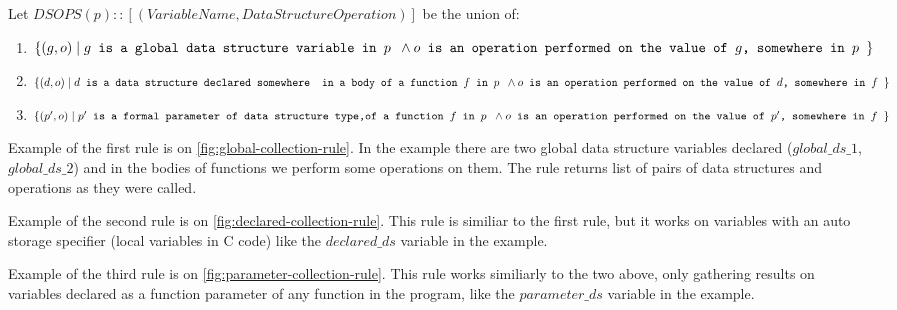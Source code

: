 \documentclass[a4paper,11pt]{article}
\begin{document}
		Let $DSOPS(p) :: [(VariableName, DataStructureOperation)]$ be the union of:
		\begin{enumerate}

			\item \label{it:global} $\{(g, o)\; |\; g \texttt{ is a global data structure variable in $p$ }
				\wedge \\ o \texttt{ is an operation performed on the value of $g$, somewhere in $p$ } \}$

			\item \label{it:auto} $\{(d, o)\; |\; d \texttt{ is a data structure declared somewhere } \\
				\texttt{ in a body of a function $f$ in $p$ } \wedge \\ o \texttt{ is an operation
				performed on the value of $d$, somewhere in $f$ } \}$

			\item \label{it:param} $\{(p', o)\; |\; p' \texttt{ is a formal parameter of data structure type,}
				\\ \texttt{of a function $f$ in $p$ } \wedge \\ o \texttt{ is an operation performed on the value of 
				$p'$, somewhere in $f$ } \}$

		\end{enumerate}

		Example of the first rule is on \autoref{fig:global-collection-rule}. In the example there are two global data structure variables declared ($global\_ds\_1$, $global\_ds\_2$) and in the bodies of functions we perform some operations on them. The rule returns list of pairs of data structures and operations as they were called.

		Example of the second rule is on \autoref{fig:declared-collection-rule}. This rule is similiar to the first rule, but it works on variables with an auto storage specifier (local variables in C code) like the $declared\_ds$ variable in the example.

		Example of the third rule is on \autoref{fig:parameter-collection-rule}. This rule works similiarly to the two above, only gathering results on variables declared as a function parameter of any function in the program, like the $parameter\_ds$ variable in the example.
\end{document}
